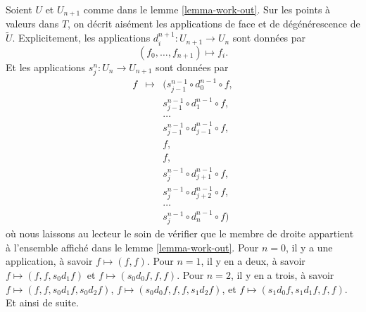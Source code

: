 \begin{remark}
\label{remark-explicit-face-degeneracy}
Soient $U$ et $U_{n + 1}$ comme dans le lemme \ref{lemma-work-out}.
Sur les points à valeurs dans $T$, on décrit aisément les applications
de face et de dégénérescence de $\tilde U$. Explicitement, les
applications $d^{n + 1}_i : U_{n + 1} \to U_n$ sont données par
$$
(f_0, \ldots, f_{n + 1}) \longmapsto f_i.
$$
Et les applications $s^n_j : U_n \to U_{n + 1}$ sont données par
\begin{eqnarray*}
f & \longmapsto & (
s^{n - 1}_{j - 1} \circ d^{n - 1}_0 \circ f, \\
& &
s^{n - 1}_{j - 1} \circ d^{n - 1}_1 \circ f, \\
& &
\ldots\\
& &
s^{n - 1}_{j - 1} \circ d^{n - 1}_{j - 1} \circ f, \\
& &
f, \\
& &
f, \\
& &
s^{n - 1}_j \circ d^{n - 1}_{j + 1} \circ f, \\
& &
s^{n - 1}_j \circ d^{n - 1}_{j + 2} \circ f, \\
& &
\ldots\\
& &
s^{n - 1}_j \circ d^{n - 1}_n \circ f
)
\end{eqnarray*}
où nous laissons au lecteur le soin de vérifier que le membre de droite
appartient à l'ensemble affiché dans le lemme \ref{lemma-work-out}.
Pour $n = 0$, il y a une application, à savoir $f \mapsto (f, f)$.
Pour $n = 1$, il y en a deux, à savoir
$f \mapsto (f, f, s_0d_1f)$ et
$f \mapsto (s_0d_0f, f, f)$.
Pour $n = 2$, il y en a trois, à savoir
$f \mapsto (f, f, s_0d_1f, s_0d_2f)$,
$f \mapsto (s_0d_0f, f, f, s_1d_2f)$, et
$f \mapsto (s_1d_0f, s_1d_1f, f, f)$.
Et ainsi de suite.
\end{remark}

